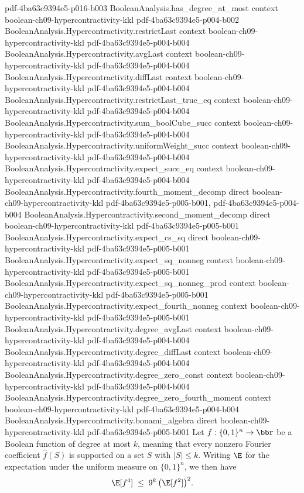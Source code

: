 \begin{lemma}
  {pdf-4ba63c9394e5-p016-b003}
\proofstep
  {BooleanAnalysis.has_degree_at_most}
  {context}
  {boolean-ch09-hypercontractivity-kkl}
  {pdf-4ba63c9394e5-p004-b002}
\proofstep
  {BooleanAnalysis.Hypercontractivity.restrictLast}
  {context}
  {boolean-ch09-hypercontractivity-kkl}
  {pdf-4ba63c9394e5-p004-b004}
\proofstep
  {BooleanAnalysis.Hypercontractivity.avgLast}
  {context}
  {boolean-ch09-hypercontractivity-kkl}
  {pdf-4ba63c9394e5-p004-b004}
\proofstep
  {BooleanAnalysis.Hypercontractivity.diffLast}
  {context}
  {boolean-ch09-hypercontractivity-kkl}
  {pdf-4ba63c9394e5-p004-b004}
\proofstep
  {BooleanAnalysis.Hypercontractivity.restrictLast_true_eq}
  {context}
  {boolean-ch09-hypercontractivity-kkl}
  {pdf-4ba63c9394e5-p004-b004}
\proofstep
  {BooleanAnalysis.Hypercontractivity.sum_boolCube_succ}
  {context}
  {boolean-ch09-hypercontractivity-kkl}
  {pdf-4ba63c9394e5-p004-b004}
\proofstep
  {BooleanAnalysis.Hypercontractivity.uniformWeight_succ}
  {context}
  {boolean-ch09-hypercontractivity-kkl}
  {pdf-4ba63c9394e5-p004-b004}
\proofstep
  {BooleanAnalysis.Hypercontractivity.expect_succ_eq}
  {context}
  {boolean-ch09-hypercontractivity-kkl}
  {pdf-4ba63c9394e5-p004-b004}
\proofstep
  {BooleanAnalysis.Hypercontractivity.fourth_moment_decomp}
  {direct}
  {boolean-ch09-hypercontractivity-kkl}
  {pdf-4ba63c9394e5-p005-b001,
    pdf-4ba63c9394e5-p004-b004}
\proofstep
  {BooleanAnalysis.Hypercontractivity.second_moment_decomp}
  {direct}
  {boolean-ch09-hypercontractivity-kkl}
  {pdf-4ba63c9394e5-p005-b001}
\proofstep
  {BooleanAnalysis.Hypercontractivity.expect_cs_sq}
  {direct}
  {boolean-ch09-hypercontractivity-kkl}
  {pdf-4ba63c9394e5-p005-b001}
\proofstep
  {BooleanAnalysis.Hypercontractivity.expect_sq_nonneg}
  {context}
  {boolean-ch09-hypercontractivity-kkl}
  {pdf-4ba63c9394e5-p005-b001}
\proofstep
  {BooleanAnalysis.Hypercontractivity.expect_sq_nonneg_prod}
  {context}
  {boolean-ch09-hypercontractivity-kkl}
  {pdf-4ba63c9394e5-p005-b001}
\proofstep
  {BooleanAnalysis.Hypercontractivity.expect_fourth_nonneg}
  {context}
  {boolean-ch09-hypercontractivity-kkl}
  {pdf-4ba63c9394e5-p005-b001}
\proofstep
  {BooleanAnalysis.Hypercontractivity.degree_avgLast}
  {context}
  {boolean-ch09-hypercontractivity-kkl}
  {pdf-4ba63c9394e5-p004-b004}
\proofstep
  {BooleanAnalysis.Hypercontractivity.degree_diffLast}
  {context}
  {boolean-ch09-hypercontractivity-kkl}
  {pdf-4ba63c9394e5-p004-b004}
\proofstep
  {BooleanAnalysis.Hypercontractivity.degree_zero_const}
  {context}
  {boolean-ch09-hypercontractivity-kkl}
  {pdf-4ba63c9394e5-p004-b004}
\proofstep
  {BooleanAnalysis.Hypercontractivity.degree_zero_fourth_moment}
  {context}
  {boolean-ch09-hypercontractivity-kkl}
  {pdf-4ba63c9394e5-p004-b004}
\proofstep
  {BooleanAnalysis.Hypercontractivity.bonami_algebra}
  {direct}
  {boolean-ch09-hypercontractivity-kkl}
  {pdf-4ba63c9394e5-p005-b001}
Let $f : \{0,1\}^n \to \bbr$ be a Boolean function of degree at most $k$, meaning that
every nonzero Fourier coefficient $\hat f(S)$ is supported on a set $S$ with $|S| \le
k$. Writing $\E$ for the expectation under the uniform measure on $\{0,1\}^n$, we then
have
\[
  \E[f^4] \;\le\; 9^{k}\,\bigl(\E[f^2]\bigr)^2.
\]
\end{lemma}

